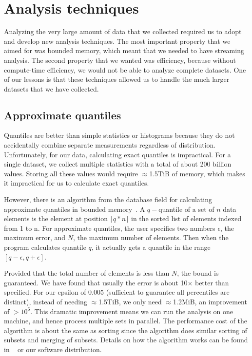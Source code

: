 \section{Analysis techniques}
\label{sec:analysis-techniques}

Analyzing the very large amount of data that we collected required
us to adopt and develop new analysis techniques.
The most important property that we aimed for was bounded memory,
which meant that we needed to have streaming analysis.  The second
property that we wanted was efficiency, because without compute-time efficiency, we
would not be able to analyze complete datasets.  One of our lessons is
that these techniques allowed us to handle the much larger datasets that
we have collected.

\subsection{Approximate quantiles}


Quantiles are better than simple statistics or histograms because they
do not accidentally combine separate measurements regardless of
distribution.  Unfortunately, for our data, calculating exact quantiles
is impractical.  For a single dataset, we collect multiple statistics
with a total of about 200 billion values.  Storing all these values
would require $\approx$1.5TiB of memory, which makes it impractical
for us to calculate exact quantiles.

However, there is an algorithm from the database field for calculating
approximate quantiles in bounded
memory~\cite{Manku98approximatemedians}.  A $q-$quantile of a set of
$n$ data elements is the element at position $\lceil q*n\rceil$ in the
sorted list of elements indexed from 1 to n.  For approximate
quantiles, the user specifies two numbers $\epsilon$, the maximum
error, and $N$, the maximum number of elements.  Then when the program
calculates quantile $q$, it actually gets a quantile in the range
$[q-\epsilon,q+\epsilon]$.  

Provided that the total number of elements
is less than $N$, the bound is guaranteed.  We have found that
usually the error is about 10$\times$ better than specified.  For our
epsilon of 0.005 (sufficient to guarantee all percentiles are
distinct), instead of needing $\approx$1.5TiB, we only need
$\approx$1.2MiB, an improvement of $>10^6$.  This dramatic improvement
means we can run the analysis on one machine, and hence process
multiple sets in parallel.  The performance cost of the algorithm is
about the same as sorting since the algorithm does similar sorting of
subsets and merging of subsets.  Details on how the algorithm works
can be found in ~\cite{Manku98approximatemedians} or our software
distribution.

